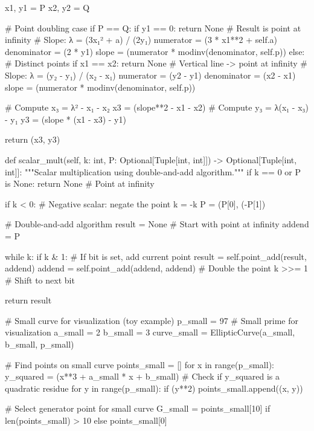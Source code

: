 \documentclass[a4paper, 11pt]{article}
\begin{document}
\begin{pycode}
        x1, y1 = P
        x2, y2 = Q

        # Point doubling case
        if P == Q:
            if y1 == 0:
                return None  # Result is point at infinity
            # Slope: λ = (3x₁² + a) / (2y₁)
            numerator = (3 * x1**2 + self.a) %
            denominator = (2 * y1) %
            slope = (numerator * modinv(denominator, self.p)) %
        else:
            # Distinct points
            if x1 == x2:
                return None  # Vertical line -> point at infinity
            # Slope: λ = (y₂ - y₁) / (x₂ - x₁)
            numerator = (y2 - y1) %
            denominator = (x2 - x1) %
            slope = (numerator * modinv(denominator, self.p)) %

        # Compute x₃ = λ² - x₁ - x₂
        x3 = (slope**2 - x1 - x2) %
        # Compute y₃ = λ(x₁ - x₃) - y₁
        y3 = (slope * (x1 - x3) - y1) %

        return (x3, y3)

    def scalar_mult(self, k: int, P: Optional[Tuple[int, int]]) -> Optional[Tuple[int, int]]:
        """Scalar multiplication using double-and-add algorithm."""
        if k == 0 or P is None:
            return None  # Point at infinity

        if k < 0:
            # Negative scalar: negate the point
            k = -k
            P = (P[0], (-P[1]) %

        # Double-and-add algorithm
        result = None  # Start with point at infinity
        addend = P

        while k:
            if k & 1:  # If bit is set, add current point
                result = self.point_add(result, addend)
            addend = self.point_add(addend, addend)  # Double the point
            k >>= 1  # Shift to next bit

        return result

# Small curve for visualization (toy example)
p_small = 97  # Small prime for visualization
a_small = 2
b_small = 3
curve_small = EllipticCurve(a_small, b_small, p_small)

# Find points on small curve
points_small = []
for x in range(p_small):
    y_squared = (x**3 + a_small * x + b_small) %
    # Check if y_squared is a quadratic residue
    for y in range(p_small):
        if (y**2) %
            points_small.append((x, y))

# Select generator point for small curve
G_small = points_small[10] if len(points_small) > 10 else points_small[0]


\end{pycode}
\end{document}
